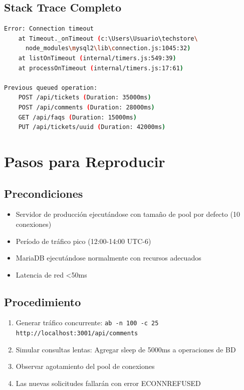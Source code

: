 \documentclass[12pt,a4paper]{article}
\begin{document}
\subsection{Stack Trace Completo}

\begin{lstlisting}[language=bash, caption=Stack trace detallado]
Error: Connection timeout
    at Timeout._onTimeout (c:\Users\Usuario\techstore\
      node_modules\mysql2\lib\connection.js:1045:32)
    at listOnTimeout (internal/timers.js:549:39)
    at processOnTimeout (internal/timers.js:17:61)

Previous queued operation:
    POST /api/tickets (Duration: 35000ms)
    POST /api/comments (Duration: 28000ms)
    GET /api/faqs (Duration: 15000ms)
    PUT /api/tickets/uuid (Duration: 42000ms)
\end{lstlisting}

\newpage

\section{Pasos para Reproducir}

\subsection{Precondiciones}

\begin{itemize}
    \item Servidor de producción ejecutándose con tamaño de pool por defecto (10 conexiones)
    \item Período de tráfico pico (12:00-14:00 UTC-6)
    \item MariaDB ejecutándose normalmente con recursos adecuados
    \item Latencia de red \textless 50ms
\end{itemize}

\subsection{Procedimiento}

\begin{enumerate}
    \item Generar tráfico concurrente: \texttt{ab -n 100 -c 25 http://localhost:3001/api/comments}
    \item Simular consultas lentas: Agregar sleep de 5000ms a operaciones de BD
    \item Observar agotamiento del pool de conexiones
    \item Las nuevas solicitudes fallarán con error ECONNREFUSED
\end{enumerate}
\end{document}
